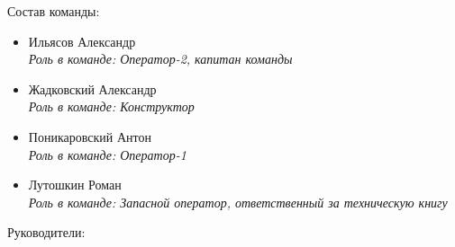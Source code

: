 \large Состав команды:


\begin{itemize}
	\item	Ильясов Александр\\
		\emph{Роль в команде: Оператор-2, капитан команды}
	\item Жадковский Александр\\
		\emph{Роль в команде: Конструктор}
	\item	Поникаровский Антон\\
		\emph{Роль в команде: Оператор-1}
	\item	Лутошкин Роман\\
		\emph{Роль в команде: Запасной оператор, ответственный за техническую книгу}
		
\end{itemize}


\newpage

\large Руководители:

